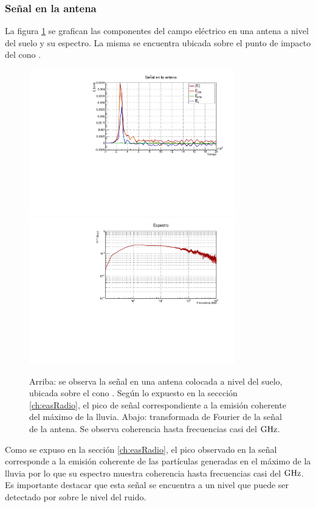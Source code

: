 	\subsubsection{Señal en la antena}
	La figura \ref{fig:antSig} se grafican las componentes del campo eléctrico en una antena a nivel del suelo y su espectro. La misma se encuentra ubicada sobre el punto de impacto del cono \cher{}.
	\begin{figure}[ht!]
		\centering
		\includegraphics[width=0.8\textwidth]{./fig/simulacionRadio/antennaSignal}\\
		\includegraphics[width=0.8\textwidth]{./fig/simulacionRadio/antennaSpec}
		\caption{\label{fig:antSig}
		Arriba: se observa la señal en una antena colocada a nivel del suelo, ubicada sobre el cono \cher{}. Según lo expuesto en la seccción \ref{ch:easRadio}, el pico de señal correspondiente a la emisión coherente del máximo de la lluvia.
		Abajo: transformada de Fourier de la señal de la antena. Se observa coherencia hasta frecuencias casi del $\rm GHz$.
		}
	\end{figure}
	Como se expuso en la sección \ref{ch:easRadio}, el pico observado en la señal corresponde a la emisión coherente de las partículas generadas en el máximo de la lluvia por lo que su espectro muestra coherencia hasta frecuencias casi del $\rm GHz$.
	Es importante destacar que esta señal se encuentra a un nivel que puede ser detectado por sobre le nivel del ruido. 
	
